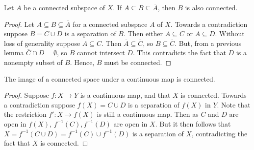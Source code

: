 \documentclass[12pt, a4paper, oneside, openright, titlepage]{book}
\begin{document}
\begin{theorem}
    Let $A$ be a connected subspace of $X$. If $A \subseteq B \subseteq \overline{A}$, then $B$ is also connected.
\end{theorem}
\begin{proof}
    Let $A \subseteq B \subseteq \overline{A}$ for a connected subspace $A$ of $X$. Towards a contradiction suppose $B = C\cup D$ is a separation of $B$. Then either $A \subseteq C$ or $A \subseteq D$. Without loss of generality suppose $A \subseteq C$. Then $\overline{A} \subseteq \overline{C}$, so $B \subseteq \overline{C}$. But, from a previous lemma $\overline{C}\cap D = \emptyset$, so $B$ cannot intersect $D$. This contradicts the fact that $D$ is a nonempty subset of $B$. Hence, $B$ must be connected.
\end{proof}


\begin{theorem}
    The image of a connected space under a continuous map is connected.
\end{theorem}
\begin{proof}
    Suppose $f:X\rightarrow Y$ is a continuous map, and that $X$ is connected. Towards a contradiction suppose $f(X) = C\cup D$ is a separation of $f(X)$ in $Y$. Note that the restriction $f':X\rightarrow f(X)$ is still a continuous map. Then as $C$ and $D$ are open in $f(X)$, $f^{-1}(C),f^{-1}(D)$ are open in $X$. But it then follows that $X = f^{-1}(C\cup D) = f^{-1}(C)\cup f^{-1}(D)$ is a separation of $X$, contradicting the fact that $X$ is connected.
\end{proof}
\end{document}
